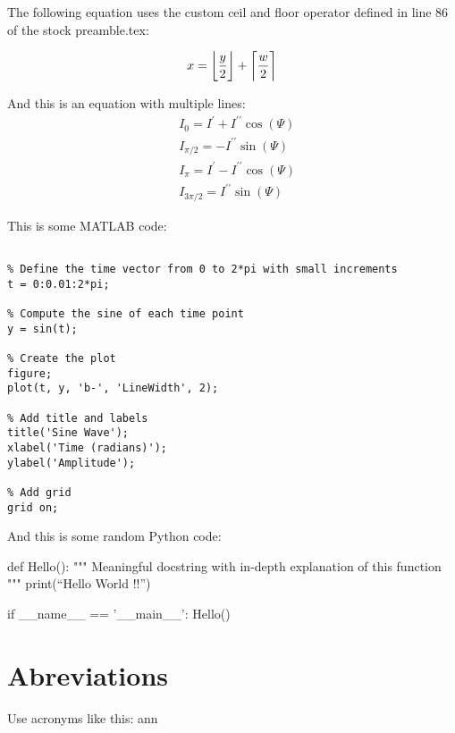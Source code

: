 The following equation uses the custom ceil and floor operator defined in line 86 of the stock preamble.tex:

\begin{equation}
x = \floor*{\frac{y}{2}} + \ceil*{\frac{w}{2}}
\end{equation}


And this is an equation with multiple lines:
\begin{equation}
\begin{aligned}
&I_{0}=I^{\prime}+I^{\prime\prime}\cos(\varPsi)   \\
&I_{\pi/2}=-I^{\prime\prime}\sin(\varPsi)                \\
&I_{\pi}=I^{\prime}-I^{\prime\prime}\cos(\varPsi)   \\
&I_{3\pi/2}=I^{\prime\prime}\sin(\varPsi)
\end{aligned}
\end{equation}

This is some MATLAB code:
\begin{lstlisting}[style=Matlab-editor]
% Sample MATLAB Code: Plotting a Sine Wave

% Define the time vector from 0 to 2*pi with small increments
t = 0:0.01:2*pi;

% Compute the sine of each time point
y = sin(t);

% Create the plot
figure;
plot(t, y, 'b-', 'LineWidth', 2);

% Add title and labels
title('Sine Wave');
xlabel('Time (radians)');
ylabel('Amplitude');

% Add grid
grid on;
\end{lstlisting}

And this is some random Python code:

\begin{python}
def Hello():
    """
      Meaningful docstring with in-depth explanation of this function
    """
    print(``Hello World !!'')

if __name__ == '__main__':
    Hello()
\end{python}

\section{Abreviations}

\begin{acronym}
\end{acronym}

Use acronyms like this: \ac{ann}

